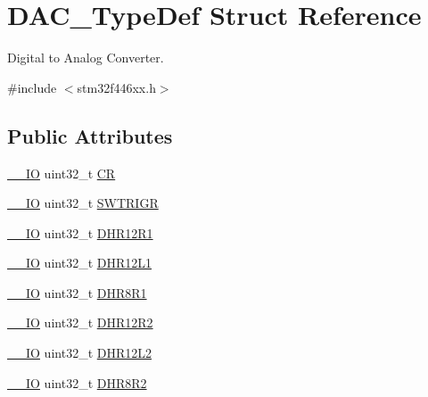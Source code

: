 \hypertarget{struct_d_a_c___type_def}{}\section{D\+A\+C\+\_\+\+Type\+Def Struct Reference}
\label{struct_d_a_c___type_def}


Digital to Analog Converter.  




{\ttfamily \#include $<$stm32f446xx.\+h$>$}

\subsection*{Public Attributes}
\begin{DoxyCompactItemize}
\item 
\hyperlink{core__sc300_8h_aec43007d9998a0a0e01faede4133d6be}{\+\_\+\+\_\+\+IO} uint32\+\_\+t \hyperlink{struct_d_a_c___type_def_a394324f0b573837ca15a87127b2a37ea}{CR}
\item 
\hyperlink{core__sc300_8h_aec43007d9998a0a0e01faede4133d6be}{\+\_\+\+\_\+\+IO} uint32\+\_\+t \hyperlink{struct_d_a_c___type_def_a4ccb66068a1ebee1179574dda20206b6}{S\+W\+T\+R\+I\+GR}
\item 
\hyperlink{core__sc300_8h_aec43007d9998a0a0e01faede4133d6be}{\+\_\+\+\_\+\+IO} uint32\+\_\+t \hyperlink{struct_d_a_c___type_def_afbfd2855cdb81939b4efc58e08aaf3e5}{D\+H\+R12\+R1}
\item 
\hyperlink{core__sc300_8h_aec43007d9998a0a0e01faede4133d6be}{\+\_\+\+\_\+\+IO} uint32\+\_\+t \hyperlink{struct_d_a_c___type_def_a5eb63912e39085e3e13d64bdb0cf38bd}{D\+H\+R12\+L1}
\item 
\hyperlink{core__sc300_8h_aec43007d9998a0a0e01faede4133d6be}{\+\_\+\+\_\+\+IO} uint32\+\_\+t \hyperlink{struct_d_a_c___type_def_a3a382d341fb608a04390bacb8c00b0f0}{D\+H\+R8\+R1}
\item 
\hyperlink{core__sc300_8h_aec43007d9998a0a0e01faede4133d6be}{\+\_\+\+\_\+\+IO} uint32\+\_\+t \hyperlink{struct_d_a_c___type_def_ab1f777540c487c26bf27e6fa37a644cc}{D\+H\+R12\+R2}
\item 
\hyperlink{core__sc300_8h_aec43007d9998a0a0e01faede4133d6be}{\+\_\+\+\_\+\+IO} uint32\+\_\+t \hyperlink{struct_d_a_c___type_def_a9f612b6b3e065e810e5a2fb254d6a40b}{D\+H\+R12\+L2}
\item 
\hyperlink{core__sc300_8h_aec43007d9998a0a0e01faede4133d6be}{\+\_\+\+\_\+\+IO} uint32\+\_\+t \hyperlink{struct_d_a_c___type_def_a3b096b71656f8fb32cd18b4c8b1d2334}{D\+H\+R8\+R2}

\end{DoxyCompactItemize}
